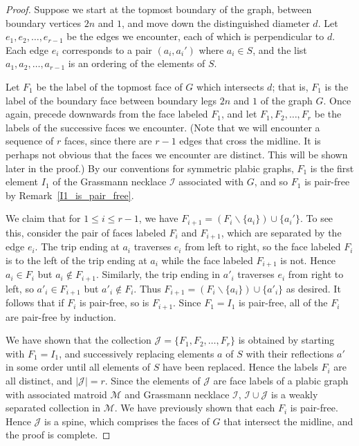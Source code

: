 \documentclass[ALCO,ThmDefs,Unicode,epreuves]{cedram}
\begin{document}
\begin{proof}
Suppose we start at the topmost boundary of the graph, between boundary vertices $2n$ and $1$, and move down the distinguished diameter $d$. Let $e_1, e_2, \ldots, e_{r-1}$ be the edges we encounter, each of which is perpendicular to $d$. Each edge $e_i$ corresponds to a pair $(a_i, a_i')$ where $a_i \in S$, and the list $a_1,a_2,\ldots,a_{r-1}$ is an ordering of the elements of $S$.

Let $F_1$ be the label of the topmost face of $G$ which intersects $d$; that is, $F_1$ is the label of the boundary face between boundary legs $2n$ and $1$ of the graph $G$. Once again, precede downwards from the face labeled $F_1$, and let $F_1, F_2, \ldots, F_r$ be the labels of the successive faces we encounter. (Note that we will encounter a sequence of $r$ faces, since there are $r-1$ edges that cross the midline. It is perhaps not obvious that the faces we encounter are distinct. This will be shown later in the proof.) By our conventions for symmetric plabic graphs, $F_1$ is the first element $I_1$ of the Grassmann necklace $\mathcal{I}$ associated with $G$, and so $F_1$ is pair-free by Remark~\ref{I1_is_pair_free}.

We claim that for $1 \leq i \leq r-1$, we have $F_{i+1} = (F_i \backslash \{a_i\}) \cup \{a_i'\}$. To see this, consider the pair of faces labeled $F_i$ and $F_{i+1}$, which are separated by the edge $e_i$. The trip ending at $a_i$ traverses $e_i$ from left to right, so the face labeled $F_{i}$ is to the left of the trip ending at $a_i$ while the face labeled $F_{i+1}$ is not. Hence $a_i \in F_{i}$ but $a_i \not\in F_{i+1}$. Similarly, the trip ending in $a'_i$ traverses $e_i$ from right to left, so $a'_i \in F_{i+1}$ but $a'_i \not\in F_{i}$. Thus $F_{i+1} = (F_i \backslash \{a_i\}) \cup \{a'_i\}$ as desired. It follows that if $F_i$ is pair-free, so is $F_{i+1}$. Since $F_1 = I_1$ is pair-free, all of the $F_i$ are pair-free by induction.

We have shown that the collection $\mathcal{J} = \{F_1, F_2, \ldots, F_r\}$ is obtained by starting with $F_1 = I_1$, and successively replacing elements $a$ of $S$ with their reflections $a'$ in some order until all elements of $S$ have been replaced. Hence the labels $F_i$ are all distinct, and $|\mathcal{J}| = r$. Since the elements of $\mathcal{J}$ are face labels of a plabic graph with associated matroid $\mathcal{M}$ and Grassmann necklace $\mathcal{I}$, $\mathcal{I} \cup \mathcal{J}$ is a weakly separated collection in $\mathcal{M}$. We have previously shown that each $F_i$ is pair-free. Hence $\mathcal{J}$ is a spine, which comprises the faces of $G$ that intersect the midline, and the proof is complete.\end{proof}
\end{document}
